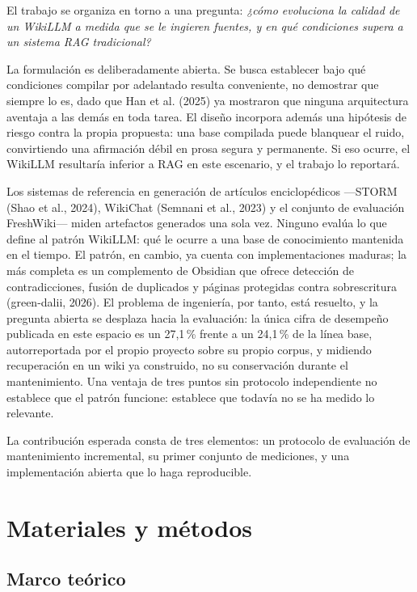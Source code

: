 \documentclass[11pt,letterpaper]{article}
\begin{document}
El trabajo se organiza en torno a una pregunta: \textit{¿cómo evoluciona la calidad de un WikiLLM a
medida que se le ingieren fuentes, y en qué condiciones supera a un sistema RAG tradicional?}

La formulación es deliberadamente abierta. Se busca establecer bajo qué condiciones compilar por
adelantado resulta conveniente, no demostrar que siempre lo es, dado que Han et al. (2025) ya
mostraron que ninguna arquitectura aventaja a las demás en toda tarea. El diseño incorpora además una
hipótesis de riesgo contra la propia propuesta: una base compilada puede blanquear el ruido,
convirtiendo una afirmación débil en prosa segura y permanente. Si eso ocurre, el WikiLLM resultaría
inferior a RAG en este escenario, y el trabajo lo reportará.

Los sistemas de referencia en generación de artículos enciclopédicos —STORM (Shao et al., 2024),
WikiChat (Semnani et al., 2023) y el conjunto de evaluación FreshWiki— miden artefactos generados una
sola vez. Ninguno evalúa lo que define al patrón WikiLLM: qué le ocurre a una base de conocimiento
mantenida en el tiempo. El patrón, en cambio, ya cuenta con implementaciones maduras; la más completa
es un complemento de Obsidian que ofrece detección de contradicciones, fusión de duplicados y páginas
protegidas contra sobrescritura (green-dalii, 2026). El problema de ingeniería, por tanto, está
resuelto, y la pregunta abierta se desplaza hacia la evaluación: la única cifra de desempeño publicada
en este espacio es un 27,1\,\% frente a un 24,1\,\% de la línea base, autorreportada por el propio
proyecto sobre su propio corpus, y midiendo recuperación en un wiki ya construido, no su conservación
durante el mantenimiento. Una ventaja de tres puntos sin protocolo independiente no establece que el
patrón funcione: establece que todavía no se ha medido lo relevante.

La contribución esperada consta de tres elementos: un protocolo de evaluación de mantenimiento
incremental, su primer conjunto de mediciones, y una implementación abierta que lo haga reproducible.

\section{Materiales y métodos}

\subsection{Marco teórico}
\end{document}
